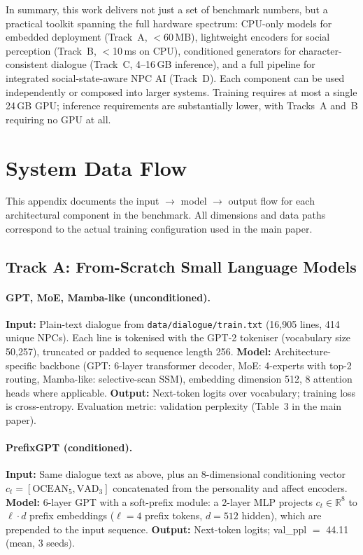 \documentclass[11pt]{article}
\begin{document}
In summary, this work delivers not just a set of benchmark numbers, but a practical toolkit spanning the full hardware spectrum: CPU-only models for embedded deployment (Track~A, {$<$}60\,MB), lightweight encoders for social perception (Track~B, {$<$}10\,ms on CPU), conditioned generators for character-consistent dialogue (Track~C, 4--16\,GB inference), and a full pipeline for integrated social-state-aware NPC AI (Track~D).
Each component can be used independently or composed into larger systems.
Training requires at most a single 24\,GB GPU; inference requirements are substantially lower, with Tracks~A and~B requiring no GPU at all.

\section{System Data Flow}
\label{app:dataflow}

This appendix documents the input $\rightarrow$ model $\rightarrow$ output flow for each architectural component in the benchmark.
All dimensions and data paths correspond to the actual training configuration used in the main paper.

\subsection{Track A: From-Scratch Small Language Models}

\paragraph{GPT, MoE, Mamba-like (unconditioned).}
\textbf{Input:} Plain-text dialogue from \texttt{data/dialogue/train.txt} (16,905 lines, 414 unique NPCs).
Each line is tokenised with the GPT-2 tokeniser (vocabulary size 50,257), truncated or padded to sequence length 256.
\textbf{Model:} Architecture-specific backbone (GPT: 6-layer transformer decoder, MoE: 4-experts with top-2 routing, Mamba-like: selective-scan SSM), embedding dimension 512, 8 attention heads where applicable.
\textbf{Output:} Next-token logits over vocabulary; training loss is cross-entropy.
Evaluation metric: validation perplexity (Table~3 in the main paper).

\paragraph{PrefixGPT (conditioned).}
\textbf{Input:} Same dialogue text as above, plus an 8-dimensional conditioning vector $c_t = [\text{OCEAN}_5, \text{VAD}_3]$ concatenated from the personality and affect encoders.
\textbf{Model:} 6-layer GPT with a soft-prefix module: a 2-layer MLP projects $c_t \in \mathbb{R}^8$ to $\ell \cdot d$ prefix embeddings ($\ell=4$ prefix tokens, $d=512$ hidden), which are prepended to the input sequence.
\textbf{Output:} Next-token logits; val\_ppl $=$ 44.11 (mean, 3 seeds).
\end{document}
